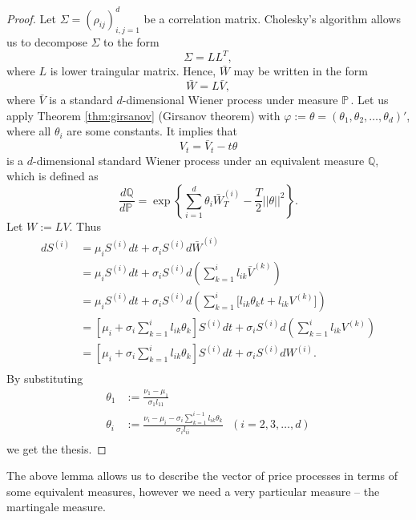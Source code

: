 \documentclass[a4paper,11pt, twoside]{book}
\theoremstyle{definition}
\theoremstyle{remark}
\def\P{{\mathbb{P}}\,}
\begin{document}
\begin{proof}
 Let $\Sigma = (\rho_{ij})_{i,j=1}^d$ be a correlation matrix. Cholesky's algorithm allows us to decompose $\Sigma$ to the form
 \[ \Sigma = LL^T, \]
 where $L$ is lower traingular matrix. Hence, $\bar{W}$ may be written in the form
 \[ \bar{W} = L \bar{V}, \]
 where $\bar{V}$ is a standard $d$-dimensional Wiener process under measure $\P$. Let us apply Theorem \ref{thm:girsanov} (Girsanov theorem) with $\varphi := \theta = (\theta_1, \theta_2, \ldots, \theta_d)'$, where all $\theta_i$ are some constants. It implies that
 \[ V_t = \bar{V}_t - t\theta \]
 is a $d$-dimensional standard Wiener process under an equivalent measure $\mathbb{Q}$, which is defined as
 \[\frac{d\mathbb{Q}}{d\P} = \exp\left\{ \sum\limits_{i=1}^d \theta_i \bar{W}^{(i)}_T - \frac{T}{2} ||\theta||^2 \right\}.\]
 Let $W := LV$. Thus
 \begin{equation*}
  \begin{split}
   dS^{(i)} &= \mu_i S^{(i)} dt + \sigma_i S^{(i)} d\bar{W}^{(i)} \\
            &= \mu_i S^{(i)} dt + \sigma_i S^{(i)} d\left(\sum\limits_{k=1}^i l_{ik} \bar{V}^{(k)}\right) \\
            &= \mu_i S^{(i)} dt + \sigma_i S^{(i)} d\left(\sum\limits_{k=1}^i \bigl[ l_{ik}\theta_k t + l_{ik} V^{(k)} \bigr] \right) \\    
            &= \left[ \mu_i + \sigma_i \sum\limits_{k=1}^i l_{ik}\theta_k \right] S^{(i)}dt + \sigma_i S^{(i)} d\left( \sum\limits_{k=1}^i l_{ik} V^{(k)} \right) \\    
            &= \left[ \mu_i + \sigma_i \sum\limits_{k=1}^i l_{ik}\theta_k \right] S^{(i)}dt + \sigma_i S^{(i)} dW^{(i)}. \\      
  \end{split}
 \end{equation*}
 By substituting
 \begin{align*}
  \theta_1 &:= \frac{\nu_1 - \mu_1}{\sigma_1 l_{11}}\\
  \theta_i &:= \frac{\nu_i - \mu_i - \sigma_i \sum\limits_{k=1}^{i-1} l_{ik}\theta_k}{\sigma_il_{ii}}\ \ \ (i=2,3,\ldots,d)\\
 \end{align*}
 we get the thesis.
\end{proof}

The above lemma allows us to describe the vector of price processes in terms of some equivalent measures, however we need a very particular measure -- the martingale measure.
\end{document}
